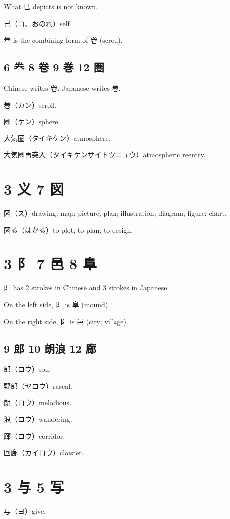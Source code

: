 What 㔾 depicts is not known.

己（コ、おのれ）self

龹 is the combining form of 卷 (scroll).

\subsection{6 龹 8 卷 9 巻 12 圏}

Chinese writes 卷.
Japanese writes 巻.

巻（カン）scroll.

圏（ケン）sphere.

大気圏（タイキケン）atmosphere.

大気圏再突入（タイキケンサイトツニュウ）atmospheric reentry.

\section{3 义 7 図}

図（ズ）drawing; map; picture; plan; illustration; diagram; figure; chart.

図る（はかる）to plot; to plan; to design.

\section{3 阝 7 邑 8 阜}

阝 has 2 strokes in Chinese and 3 strokes in Japanese.

On the left side, 阝 is 阜 (mound).

On the right side, 阝 is 邑 (city; village).

\subsection{9 郎 10 朗浪 12 廊}

郎（ロウ）son.

野郎（ヤロウ）rascal.

朗（ロウ）melodious.

浪（ロウ）wandering.

廊（ロウ）corridor.

回廊（カイロウ）cloister.

\section{3 与 5 写}

与（ヨ）give.

